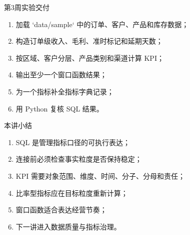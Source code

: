 \documentclass[UTF8,fontset=fandol,aspectratio=169,11pt]{ctexbeamer}
\begin{document}
\begin{frame}{第3周实验交付}
\begin{enumerate}
  \item 加载 `data/sample` 中的订单、客户、产品和库存数据；
  \item 构造订单级收入、毛利、准时标记和延期天数；
  \item 按区域、客户分层、产品类别和渠道计算 KPI；
  \item 输出至少一个窗口函数结果；
  \item 为一个指标补全指标字典记录；
  \item 用 Python 复核 SQL 结果。
\end{enumerate}
\end{frame}

\begin{frame}{本讲小结}
\begin{enumerate}
  \item SQL 是管理指标口径的可执行表达；
  \item 连接前必须检查事实粒度是否保持稳定；
  \item KPI 需要对象范围、维度、时间、分子、分母和责任；
  \item 比率型指标应在目标粒度重新计算；
  \item 窗口函数适合表达经营节奏；
  \item 下一讲进入数据质量与指标治理。
\end{enumerate}
\end{frame}
\end{document}
